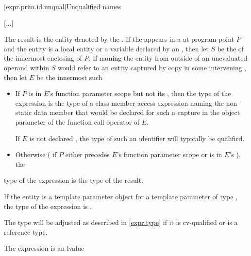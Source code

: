 \documentclass{wg21}
\begin{document}
[expr.prim.id.unqual]{Unqualified names}

[...]

\pnum
The result is the entity denoted by
the .
If the  appears
in a  at program point $P$ and
the entity is a local entity or a variable declared by
an ,
then let $S$ be the  of
the innermost enclosing  of $P$.
If naming the entity from outside of an unevaluated operand within $S$
would refer to an entity
captured by copy in some intervening ,
then let $E$ be the innermost such 
\begin{itemize}
    \item
    If  $P$ is in $E$'s function parameter scope
    but not its , then
    the type of the expression is
    the type of a class member access expression
    naming the non-static data member
    that would be declared for such a capture
    in the object parameter of the function call operator of $E$.
    \begin{note}
        If $E$ is not declared ,
        the type of such an identifier will typically be  qualified.
    \end{note}

    \item
    Otherwise ( if $P$ either precedes $E$'s function parameter scope or is in $E$'s ), the 
\end{itemize}
 type of the expression is the type of the result.
\begin{note}
    If the entity is a template parameter object for
    a template parameter of type ,
    the type of the expression is .
\end{note}
\begin{note}
    The type will be adjusted as described in \ref{expr.type}
    if it is cv-qualified or is a reference type.
\end{note}
The expression is an lvalue
\end{document}
